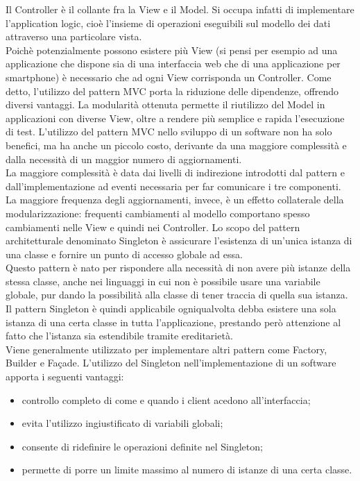 				Il Controller è il collante fra la View e il Model. Si occupa infatti di implementare l'application logic, cioè l'insieme di operazioni eseguibili sul modello dei dati attraverso una particolare vista.\\
				Poichè potenzialmente possono esistere più View (si pensi per esempio ad una applicazione che dispone sia di una interfaccia web che di una applicazione per smartphone) è necessario che ad ogni View corrisponda un Controller.
			Come detto, l'utilizzo del pattern MVC porta la riduzione delle dipendenze, offrendo diversi vantaggi. La modularità ottenuta permette il riutilizzo del Model in applicazioni con diverse View, oltre a rendere più semplice e rapida l'esecuzione di test. 
			L'utilizzo del pattern MVC nello sviluppo di un software non ha solo benefici, ma ha anche un piccolo costo, derivante da una maggiore complessità e dalla necessità di un maggior numero di aggiornamenti.\\
  			La maggiore complessità è data dai livelli di indirezione introdotti dal pattern e dall'implementazione ad eventi necessaria per far comunicare i tre componenti. La maggiore frequenza degli aggiornamenti, invece, è un effetto collaterale della modularizzazione: frequenti cambiamenti al modello comportano spesso cambiamenti nelle View e quindi nei Controller.
	 \label{app:singleton}
		Lo scopo del pattern architetturale denominato Singleton è 
		assicurare l'esistenza di un'unica istanza di una classe e fornire
		un punto di accesso globale ad essa.\\
		Questo pattern è nato per rispondere alla necessità di non avere più
		istanze della stessa classe, anche nei linguaggi in cui non è possibile 
		usare una variabile globale, pur dando la possibilità alla classe di
		tener traccia di quella sua istanza.\\
		Il pattern Singleton è quindi applicabile ogniqualvolta debba esistere una 
		sola istanza di una certa classe in tutta l'applicazione, prestando però attenzione 
		al fatto che l'istanza sia estendibile tramite ereditarietà.\\
		Viene generalmente utilizzato per implementare altri pattern come Factory, 
		Builder e Façade.
		L'utilizzo del Singleton nell'implementazione di un software apporta i seguenti 
		vantaggi:
		\begin{itemize}
		\item controllo completo di come e quando i client acedono all'interfaccia;
		\item evita l'utilizzo ingiustificato di variabili globali;
		\item consente di ridefinire le operazioni definite nel Singleton;
		\item permette di porre un limite massimo al numero di istanze di una certa classe.
		\end{itemize}
